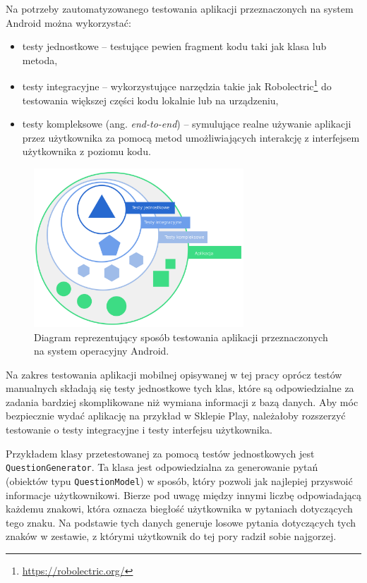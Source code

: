 \documentclass[a4paper,twoside,12pt]{book}
\newcommand{\obcy}[1]{\emph{#1}}
\newcommand{\english}[1]{{\selectlanguage{british}\obcy{#1}}}
\begin{document}
Na potrzeby zautomatyzowanego testowania aplikacji przeznaczonych na system Android można wykorzystać:
\begin{itemize}
\item testy jednostkowe -- testujące pewien fragment kodu taki jak klasa lub metoda,
\item testy integracyjne -- wykorzystujące narzędzia takie jak Robolectric\footnote{\url{https://robolectric.org/}} do testowania większej części kodu lokalnie lub na urządzeniu,
\item testy kompleksowe (ang. \english{end-to-end}) -- symulujące realne używanie aplikacji przez użytkownika za pomocą metod umożliwiających interakcję z interfejsem użytkownika z poziomu kodu.
\end{itemize}

\begin{figure}[]
\centering
\includegraphics[width=0.7\textwidth]{test-scopes}
\caption{Diagram reprezentujący sposób testowania aplikacji przeznaczonych na system operacyjny Android.}
\label{fig:testscopes}
\end{figure}

Na zakres testowania aplikacji mobilnej opisywanej w tej pracy oprócz testów manualnych składają się testy jednostkowe tych klas, które są odpowiedzialne za zadania bardziej skomplikowane niż wymiana informacji z bazą danych. Aby móc bezpiecznie wydać aplikację na przykład w Sklepie Play, należałoby rozszerzyć testowanie o testy integracyjne i testy interfejsu użytkownika. 

Przykładem klasy przetestowanej za pomocą testów jednostkowych jest \texttt{QuestionGenerator}. Ta klasa jest odpowiedzialna za generowanie pytań (obiektów typu \texttt{QuestionModel}) w sposób, który pozwoli jak najlepiej przyswoić informacje użytkownikowi. Bierze pod uwagę między innymi liczbę odpowiadającą każdemu znakowi, która oznacza biegłość użytkownika w pytaniach dotyczących tego znaku. Na podstawie tych danych generuje losowe pytania dotyczących tych znaków w zestawie, z którymi użytkownik do tej pory radził sobie najgorzej. 
\end{document}
